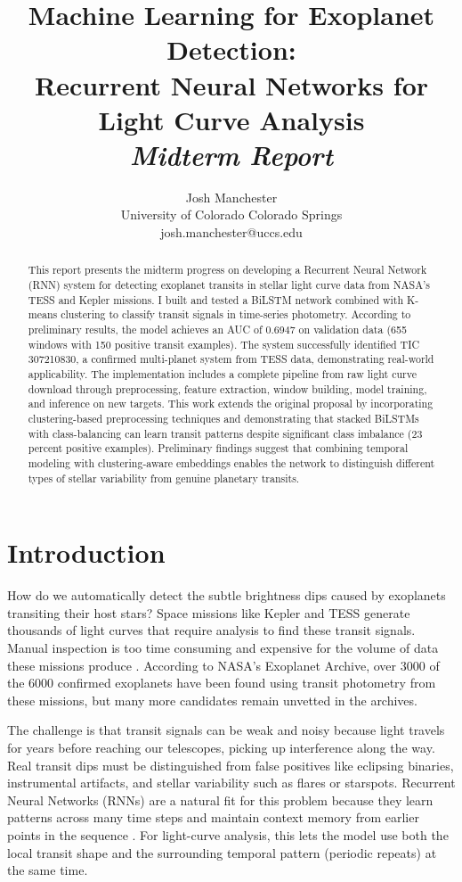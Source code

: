 \documentclass[letterpaper]{article}
\title{Machine Learning for Exoplanet Detection:\\
Recurrent Neural Networks for Light Curve Analysis\\
\textit{Midterm Report}}
\author{
Josh Manchester\\
University of Colorado Colorado Springs\\
josh.manchester@uccs.edu
}
\begin{document}
\maketitle

\begin{abstract}
This report presents the midterm progress on developing a Recurrent Neural Network (RNN) system for detecting exoplanet transits in stellar light curve data from NASA's TESS and Kepler missions. I built and tested a BiLSTM network combined with K-means clustering to classify transit signals in time-series photometry. According to preliminary results, the model achieves an AUC of 0.6947 on validation data (655 windows with 150 positive transit examples). The system successfully identified TIC 307210830, a confirmed multi-planet system from TESS data, demonstrating real-world applicability. The implementation includes a complete pipeline from raw light curve download through preprocessing, feature extraction, window building, model training, and inference on new targets. This work extends the original proposal by incorporating clustering-based preprocessing techniques and demonstrating that stacked BiLSTMs with class-balancing can learn transit patterns despite significant class imbalance (23 percent positive examples). Preliminary findings suggest that combining temporal modeling with clustering-aware embeddings enables the network to distinguish different types of stellar variability from genuine planetary transits.
\end{abstract}

\section{Introduction}

How do we automatically detect the subtle brightness dips caused by exoplanets transiting their host stars? Space missions like Kepler and TESS generate thousands of light curves that require analysis to find these transit signals. Manual inspection is too time consuming and expensive for the volume of data these missions produce \cite{Shallue2018identifyexoplanetsI}. According to NASA's Exoplanet Archive, over 3000 of the 6000 confirmed exoplanets have been found using transit photometry from these missions, but many more candidates remain unvetted in the archives.

The challenge is that transit signals can be weak and noisy because light travels for years before reaching our telescopes, picking up interference along the way. Real transit dips must be distinguished from false positives like eclipsing binaries, instrumental artifacts, and stellar variability such as flares or starspots. Recurrent Neural Networks (RNNs) are a natural fit for this problem because they learn patterns across many time steps and maintain context memory from earlier points in the sequence \cite{Vida2021findingflaresrecurrent}. For light-curve analysis, this lets the model use both the local transit shape and the surrounding temporal pattern (periodic repeats) at the same time.
\end{document}
